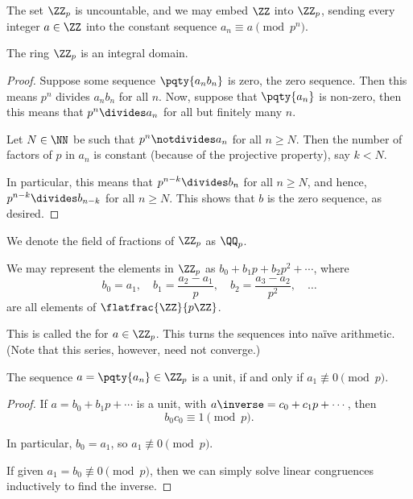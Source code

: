 The set \(\ZZ_p\) is uncountable, and we may embed \(\ZZ\) into \(\ZZ_p\), sending every integer \(a \in \ZZ\) into the constant sequence \(a_n \equiv a \pmod{p^n}\).

\begin{proposition}
    \label{prop:p-adic-integral-domain}%
    The ring \(\ZZ_p\) is an integral domain.
\end{proposition}

\begin{proof}
    Suppose some sequence \(\pqty{a_n b_n}\) is zero, the zero sequence. Then this means \(p^n\) divides \(a_n b_n\) for all \(n\). Now, suppose that \(\pqty{a_n}\) is non-zero, then this means that \(p^n \divides a_n\) for all but finitely many \(n\).

    Let \(N \in \NN\) be such that \(p^n \notdivides a_n\) for all \(n \geq N\). Then the number of factors of \(p\) in \(a_n\) is constant (because of the projective property), say \(k < N\).
    
    In particular, this means that \(p^{n - k} \divides b_n\) for all \(n \geq N\), and hence, \(p^{n - k} \divides b_{n - k}\) for all \(n \geq N\). This shows that \(b\) is the zero sequence, as desired.
\end{proof}

\begin{notation}
    We denote the field of fractions of \(\ZZ_p\) as \(\QQ_p\).
\end{notation}

We may represent the elements in \(\ZZ_p\) as \(b_0 + b_1 p + b_2 p^2 + \cdots\), where
\[
    b_0 = a_1, \quad b_1 = \frac{a_2 - a_1}{p}, \quad  b_2 = \frac{a_3 - a_2}{p^2}, \quad \ldots
\]
are all elements of \(\flatfrac{\ZZ}{p \ZZ}\).

This is called the  for \(a \in \ZZ_p\). This turns the sequences into na\"ive arithmetic. (Note that this series, however, need not converge.)

\begin{proposition}
    \label{prop:units-p-adic}%
    The sequence \(a = \pqty{a_n} \in \ZZ_p\) is a unit, if and only if \(a_1 \nequiv 0 \pmod{p}\).
\end{proposition}

\begin{proof}
    If \(a = b_0 + b_1 p + \cdots\) is a unit, with \(a\inverse = c_0 + c_1 p + \cdots\), then
    \[
        b_0 c_0 \equiv 1 \pmod{p}.
    \]

    In particular, \(b_0 = a_1\), so \(a_1 \nequiv 0 \pmod{p}\).

    If given \(a_1 = b_0 \nequiv 0 \pmod{p}\), then we can simply solve linear congruences inductively to find the inverse. 
\end{proof}

